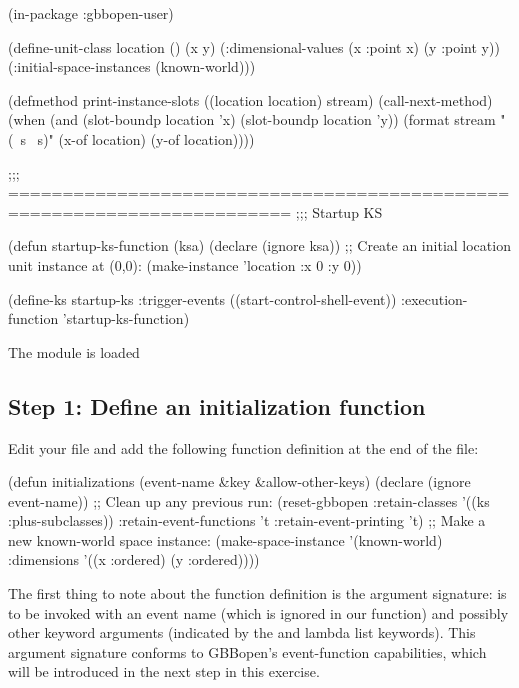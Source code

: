 \documentclass[10pt,twoside,english,pdftex]{article}
\begin{document}
\begin{example}
  (in-package :gbbopen-user)

  (define-unit-class location ()
    (x y)
    (:dimensional-values
      (x :point x)
      (y :point y))
    (:initial-space-instances (known-world)))

  (defmethod print-instance-slots ((location location) stream)
    (call-next-method)
    (when (and (slot-boundp location 'x)
               (slot-boundp location 'y))
      (format stream " (~s ~s)"
              (x-of location)
              (y-of location))))

  ;;; ========================================================================
  ;;;   Startup KS

  (defun startup-ks-function (ksa)
    (declare (ignore ksa))
    ;; Create an initial location unit instance at (0,0):
    (make-instance 'location :x 0 :y 0))

  (define-ks startup-ks
      :trigger-events ((start-control-shell-event))
      :execution-function 'startup-ks-function)
\end{example}

\begin{tightitemize}
\item The  module is loaded
\end{tightitemize}

\subsection*{Step 1: Define an initialization function}

Edit your  file and add the following function
definition at the end of the file:
%
\begin{example}
  (defun initializations (event-name &key &allow-other-keys)
    (declare (ignore event-name))
    ;; Clean up any previous run:
    (reset-gbbopen :retain-classes '((ks :plus-subclasses))
                   :retain-event-functions 't
                   :retain-event-printing 't)
    ;; Make a new known-world space instance:
    (make-space-instance 
     '(known-world)
     :dimensions '((x :ordered) (y :ordered))))
\end{example}

The first thing to note about the function definition is the argument
signature:  is to be invoked with an event name
(which is ignored in our function) and possibly other keyword
arguments (indicated by the  and 
lambda list keywords).  This argument signature conforms to GBBopen's
event-function capabilities, which will be introduced in the next step
in this exercise.
\end{document}
